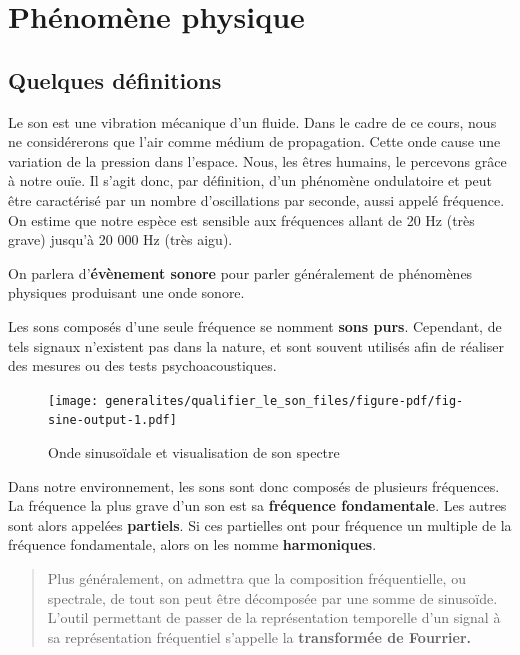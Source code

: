 \documentclass[
  letterpaper,
  DIV=11,
  numbers=noendperiod]{scrreprt}
\begin{document}
\hypertarget{phuxe9nomuxe8ne-physique}{%
\section{Phénomène physique}\label{phuxe9nomuxe8ne-physique}}

\hypertarget{quelques-duxe9finitions}{%
\subsection{Quelques définitions}\label{quelques-duxe9finitions}}

Le son est une vibration mécanique d'un fluide. Dans le cadre de ce
cours, nous ne considérerons que l'air comme médium de propagation.
Cette onde cause une variation de la pression dans l'espace. Nous, les
êtres humains, le percevons grâce à notre ouïe. Il s'agit donc, par
définition, d'un phénomène ondulatoire et peut être caractérisé par un
nombre d'oscillations par seconde, aussi appelé fréquence. On estime que
notre espèce est sensible aux fréquences allant de 20 Hz (très grave)
jusqu'à 20 000 Hz (très aigu).

On parlera d'\textbf{évènement sonore} pour parler généralement de
phénomènes physiques produisant une onde sonore.

Les sons composés d'une seule fréquence se nomment \textbf{sons purs}.
Cependant, de tels signaux n'existent pas dans la nature, et sont
souvent utilisés afin de réaliser des mesures ou des tests
psychoacoustiques.

\begin{figure}

{\centering \texttt{[image: generalites/qualifier\_le\_son\_files/figure-pdf/fig-sine-output-1.pdf]}

}

\caption{\label{fig-sine}Onde sinusoïdale et visualisation de son
spectre}

\end{figure}

Dans notre environnement, les sons sont donc composés de plusieurs
fréquences. La fréquence la plus grave d'un son est sa \textbf{fréquence
fondamentale}. Les autres sont alors appelées \textbf{partiels}. Si ces
partielles ont pour fréquence un multiple de la fréquence fondamentale,
alors on les nomme \textbf{harmoniques}.

\begin{quote}
Plus généralement, on admettra que la composition fréquentielle, ou
spectrale, de tout son peut être décomposée par une somme de sinusoïde.
L'outil permettant de passer de la représentation temporelle d'un signal
à sa représentation fréquentiel s'appelle la \textbf{transformée de
Fourrier.}
\end{quote}
\end{document}
